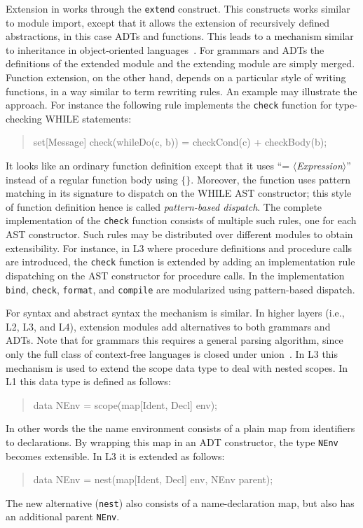 Extension in \Rascal works through the \texttt{extend} construct. This
constructs works similar to module import, except that it allows the
extension of recursively defined abstractions, in this case ADTs and
functions. This leads to a mechanism similar to inheritance in
object-oriented languages~\cite{Cook?}.  For grammars and ADTs the
definitions of the extended module and the extending module are simply
merged. Function extension, on the other hand, depends on a particular
style of writing \Rascal functions, in a way similar to term rewriting
rules. An example may illustrate the approach. For instance the
following rule implements the \texttt{check} function for
type-checking WHILE statements:
\begin{quote}
\begin{rascal}
set[Message] check(whileDo(c, b)) =
                 checkCond(c) + checkBody(b);
\end{rascal}
\end{quote}
It looks like an ordinary \Rascal function definition except that it
uses ``= $\langle$\textit{Expression}$\rangle$'' instead of a regular
function body using $\{\}$. Moreover, the function uses pattern
matching in its signature to dispatch on the WHILE AST constructor;
this style of function definition hence is called
\textit{pattern-based dispatch}.  The complete implementation of the
\texttt{check} function consists of multiple such rules, one for each
AST constructor. Such rules may be distributed over different modules
to obtain extensibility. For instance, in L3 where procedure
definitions and procedure calls are introduced, the \texttt{check}
function is extended by adding an implementation rule dispatching on
the AST constructor for procedure calls. In the \oberon implementation
\texttt{bind}, \texttt{check}, \texttt{format}, and \texttt{compile}
are modularized using pattern-based dispatch.

For syntax and abstract syntax the mechanism is similar. In higher
layers (i.e., L2, L3, and L4), extension modules add alternatives to
both grammars and ADTs. Note that for grammars this requires a general
parsing algorithm, since only the full class of context-free languages
is closed under union~\cite{?}. In L3 this mechanism is used to extend
the scope data type to deal with nested scopes. In L1 this data type
is defined as follows:
\begin{quote}
\begin{rascal}
data NEnv = scope(map[Ident, Decl] env);
\end{rascal}
\end{quote}
In other words the the name environment consists of a plain map from
identifiers to declarations. By wrapping this map in an ADT
constructor, the type \texttt{NEnv} becomes extensible. In L3 it is
extended as follows:
\begin{quote}
\begin{rascal}
data NEnv = nest(map[Ident, Decl] env, NEnv parent);
\end{rascal}
\end{quote}
The new alternative (\texttt{nest}) also consists of a
name-declaration map, but also has an additional parent
\texttt{NEnv}. 

